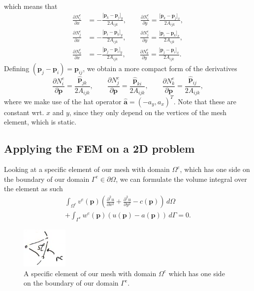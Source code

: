 \documentclass[acmtog]{acmart}
\begin{document}
%
which means that
%
\begin{align}
  \frac{ \partial N_i^e }{ \partial x } & = -\frac{\big[\boldsymbol p_k - \boldsymbol p_j\big]_y}{2 A_{ijk}}, \qquad \frac{ \partial N_i^e }{ \partial y } = \frac{\big[\boldsymbol p_k - \boldsymbol p_j\big]_x}{2 A_{ijk}}, \\
  \frac{ \partial N_j^e }{ \partial x } & = -\frac{\big[\boldsymbol p_i - \boldsymbol p_k\big]_y}{2 A_{ijk}}, \qquad \frac{ \partial N_j^e }{ \partial y } = \frac{\big[\boldsymbol p_i - \boldsymbol p_k\big]_x}{2 A_{ijk}}, \\
  \frac{ \partial N_k^e }{ \partial x } & = -\frac{\big[\boldsymbol p_j - \boldsymbol p_i\big]_y}{2 A_{ijk}}, \qquad \frac{ \partial N_k^e }{ \partial y } = \frac{\big[\boldsymbol p_j - \boldsymbol p_i\big]_x}{2 A_{ijk}}.
\end{align}
%
Defining $(\boldsymbol p_j - \boldsymbol p_i) = \boldsymbol p_{ij}$, we obtain a more compact form of the derivatives
%
\begin{equation}
  \frac{ \partial N_i^e }{ \partial \boldsymbol p } = \frac{\hat{\boldsymbol p}_{jk}}{2 A_{ijk}}, \qquad \frac{ \partial N_j^e }{ \partial \boldsymbol p } = \frac{\hat{\boldsymbol p}_{ki}}{2 A_{ijk}}, \qquad \frac{ \partial N_k^e }{ \partial \boldsymbol p } = \frac{\hat{\boldsymbol p}_{ij}}{2 A_{ijk}},
\end{equation}
%
where we make use of the hat operator $\boldsymbol {\hat a} = (-a_y, a_x)^T$. Note that these are constant wrt. $x$ and $y$, since they only depend on the vertices of the mesh element, which is static.

\subsection{Applying the FEM on a 2D problem}
Looking at a specific element of our mesh with domain $\Omega^e$, which has one side on the boundary of our domain $\Gamma^e \in \partial\Omega$, we can formulate the volume integral over the element as such
%
\begin{multline}
  \int_{\Omega^e} v^e(\boldsymbol p) \left( \frac{ \partial^{2} u }{ \partial x^{2} } + \frac{ \partial^{2} u }{ \partial y^{2} } - c(\boldsymbol  p) \right) \, d\Omega\\
  + \int_{\Gamma^e} w^e(\boldsymbol p) (u(\boldsymbol  p) - a(\boldsymbol p)) \, d\Gamma = 0.
\end{multline}
%
\begin{figure}[H]
  \centering
  \includegraphics[width=0.2\textwidth]{Images/img_6.png}
  \caption{A specific element of our mesh with domain $\Omega^e$ which has one side on the boundary of our domain $\Gamma^e$.\label{fig:ele_on_bound}}
\end{figure}
%
\end{document}
